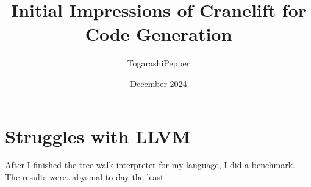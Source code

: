 \documentclass{article}
\title{Initial Impressions of Cranelift for Code Generation}
\author{TogarashiPepper}
\date{December 2024}
\begin{document}
\maketitle

\section{Struggles with LLVM}
After I finished the tree-walk interpreter for my language, I did a benchmark. The results were\dots abysmal to day the least.
\end{document}
